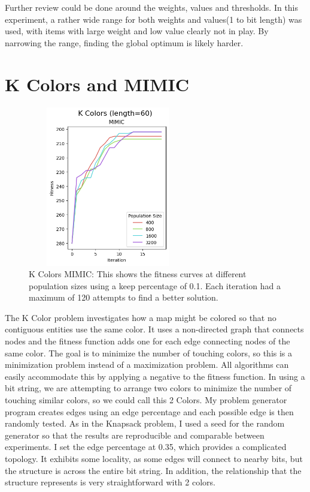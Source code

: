 \documentclass[letterpaper]{article} %
\begin{document}
Further review could be done around the weights, values and thresholds.  In this experiment,  a rather wide range for both weights and values(1 to bit length) was used, with items with large weight and low value clearly not in play.  By narrowing the range, finding the global optimum is likely harder.  


\section{K Colors and MIMIC}

\begin{figure}[!h]
\centering
\includegraphics[width=2.75in, height=2.75in]{figures/K_Colors_length=60_MIMIC_l_60_ma_120_p_400__800__1600__3200_k_0.1_.png}
\caption{K Colors MIMIC: This shows the fitness curves at different population sizes using a keep percentage of 0.1. Each iteration had a maximum of 120 attempts to find a better solution. }
\label{fig:kcolor_mimic}
\end{figure}


The K Color problem investigates how a map might be colored so that no contiguous entities use the same color.  It uses a non-directed graph that connects nodes and the fitness function adds one for each edge connecting nodes of the same color.  The goal is to minimize the number of touching colors, so this is a minimization problem instead of a maximization problem.  All algorithms can easily accommodate this by applying a negative to the fitness function.   In using a bit string, we are attempting to arrange two colors to minimize the number of touching similar colors, so we could call this 2 Colors.  My problem generator program creates edges using an edge percentage and each possible edge is then randomly tested.  As in the Knapsack problem, I used a seed for the random generator so that the results are reproducible and comparable between experiments.  I set the edge percentage at 0.35, which provides a complicated topology.  It exhibits some locality, as some edges will connect to nearby bits, but the structure is across the entire bit string.  In addition, the relationship that the structure represents is very straightforward with 2 colors. 
\end{document}
